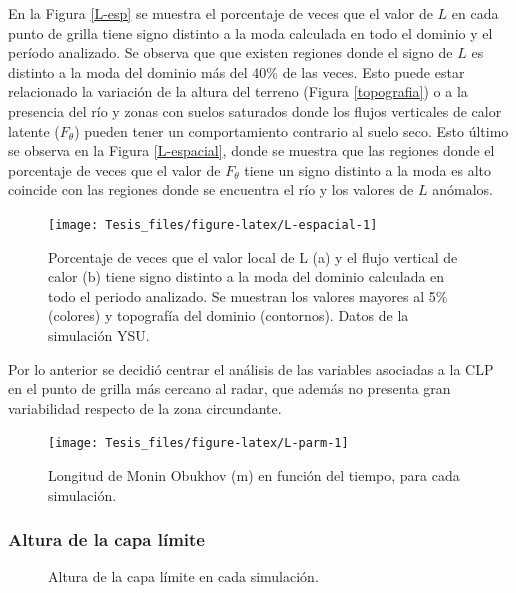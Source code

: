 \documentclass[12pt,spanish,oneside]{book}
\begin{document}
En la Figura \ref{L-esp} se muestra el porcentaje de veces que el valor
de \(L\) en cada punto de grilla tiene signo distinto a la moda
calculada en todo el dominio y el período analizado. Se observa que que
existen regiones donde el signo de \(L\) es distinto a la moda del
dominio más del 40\% de las veces. Esto puede estar relacionado la
variación de la altura del terreno (Figura \ref{topografia}) o a la
presencia del río y zonas con suelos saturados donde los flujos
verticales de calor latente (\(F_{\theta}\)) pueden tener un
comportamiento contrario al suelo seco. Esto último se observa en la
Figura \ref{L-espacial}, donde se muestra que las regiones donde el
porcentaje de veces que el valor de \(F_{\theta}\) tiene un signo
distinto a la moda es alto coincide con las regiones donde se encuentra
el río y los valores de \(L\) anómalos.

\begin{figure}

{\centering \texttt{[image: Tesis\_files/figure-latex/L-espacial-1]} 

}

\caption{Porcentaje de veces que el valor local de L (a) y el flujo vertical de calor (b) tiene signo distinto a la moda del dominio calculada en todo el periodo analizado. Se muestran los valores mayores al 5\% (colores) y topografía del dominio (contornos). Datos de la simulación YSU. \label{L-esp}}\label{fig:L-espacial}
\end{figure}

Por lo anterior se decidió centrar el análisis de las variables
asociadas a la CLP en el punto de grilla más cercano al radar, que
además no presenta gran variabilidad respecto de la zona circundante.

\begin{figure}

{\centering \texttt{[image: Tesis\_files/figure-latex/L-parm-1]} 

}

\caption{Longitud de Monin Obukhov (m) en función del tiempo, para cada simulación. \label{L-param}}\label{fig:L-parm}
\end{figure}

\subsubsection{Altura de la capa
límite}\label{altura-de-la-capa-limite-1}

\begin{figure}

{\centering {}\newline{}

}

\caption{Altura de la capa límite en cada simulación. \label{pblh-wrf}}\label{fig:pblh-wrf}
\end{figure}
\end{document}
